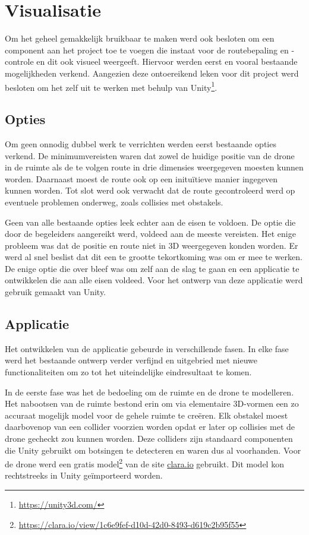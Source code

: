 \section{Visualisatie} \label{sec:visualization}
Om het geheel gemakkelijk bruikbaar te maken werd ook besloten om een component aan het project toe te voegen die instaat voor de routebepaling en -controle en dit ook visueel weergeeft. Hiervoor werden eerst en vooral bestaande mogelijkheden verkend. Aangezien deze ontoereikend leken voor dit project werd besloten om het zelf uit te werken met behulp van Unity\footnote{\url{https://unity3d.com/}}.

\subsection{Opties} \label{sec:opties}
Om geen onnodig dubbel werk te verrichten werden eerst bestaande opties verkend. De minimumvereisten waren dat zowel de huidige positie van de drone in de ruimte als de te volgen route in drie dimensies weergegeven moesten kunnen worden. Daarnaast moest de route ook op een inituïtieve manier ingegeven kunnen worden. Tot slot werd ook verwacht dat de route gecontroleerd werd op eventuele problemen onderweg, zoals collisies met obstakels.

Geen van alle bestaande opties leek echter aan de eisen te voldoen. De optie die door de begeleiders aangereikt werd, voldeed aan de meeste vereisten. Het enige probleem was dat de positie en route niet in 3D weergegeven konden worden. Er werd al snel beslist dat dit een te grootte tekortkoming was om er mee te werken. De enige optie die over bleef was om zelf aan de slag te gaan en een applicatie te ontwikkelen die aan alle eisen voldeed. Voor het ontwerp van deze applicatie werd gebruik gemaakt van Unity.

\subsection{Applicatie} \label{sec:unity}
Het ontwikkelen van de applicatie gebeurde in verschillende fasen. In elke fase werd het bestaande ontwerp verder verfijnd en uitgebried met nieuwe functionaliteiten om zo tot het uiteindelijke eindresultaat te komen.

In de eerste fase was het de bedoeling om de ruimte en de drone te modelleren. Het nabootsen van de ruimte bestond erin om via elementaire 3D-vormen een zo accuraat mogelijk model voor de gehele ruimte te creëren. Elk obstakel moest daarbovenop van een collider voorzien worden opdat er later op collisies met de drone gecheckt zou kunnen worden. Deze colliders zijn standaard componenten die Unity gebruikt om botsingen te detecteren en waren dus al voorhanden. Voor de drone werd een gratis model\footnote{\url{https://clara.io/view/1c6e9fef-d10d-42d0-8493-d619c2b95f55}} van de site \url{clara.io} gebruikt. Dit model kon rechtstreeks in Unity geïmporteerd worden.


